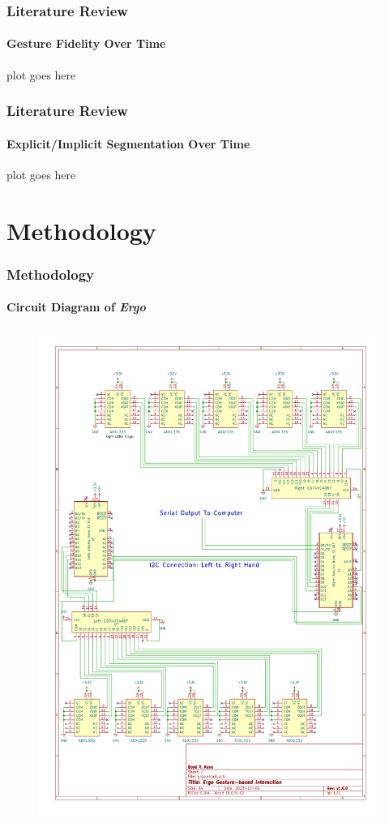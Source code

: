 \documentclass[xcolor={svgnames,table},10pt,fleqn]{beamer}
\begin{document}
\begin{frame}
    \frametitle{Literature Review}
    \framesubtitle{Gesture Fidelity Over Time}
    plot goes here
\end{frame}

\begin{frame}
    \frametitle{Literature Review}
    \framesubtitle{Explicit/Implicit Segmentation Over Time}
    plot goes here
\end{frame}

\section{Methodology}
\begin{frame}
    \frametitle{Methodology}
    \framesubtitle{Circuit Diagram of \emph{Ergo}}
    \begin{figure}[h]
        \centering
        \includegraphics[height=0.8\textheight]{imgs/ergo_schematic.pdf}
    \end{figure}
\end{frame}
\end{document}
